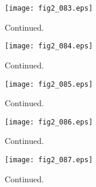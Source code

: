 \documentclass[preprint]{aastex}
\begin{document}
\setcounter{figure}{1}
\begin{figure}[t]
\centering
\texttt{[image: fig2\_083.eps]}
\caption{
Continued. 
}
\label{Fig2}
\end{figure}
\clearpage



\setcounter{figure}{1}
\begin{figure}[t]
\centering
\texttt{[image: fig2\_084.eps]}
\caption{
Continued. 
}
\label{Fig2}
\end{figure}
\clearpage



\setcounter{figure}{1}
\begin{figure}[t]
\centering
\texttt{[image: fig2\_085.eps]}
\caption{
Continued. 
}
\label{Fig2}
\end{figure}
\clearpage



\setcounter{figure}{1}
\begin{figure}[t]
\centering
\texttt{[image: fig2\_086.eps]}
\caption{
Continued. 
}
\label{Fig2}
\end{figure}
\clearpage



\setcounter{figure}{1}
\begin{figure}[t]
\centering
\texttt{[image: fig2\_087.eps]}
\caption{
Continued. 
}
\label{Fig2}
\end{figure}
\clearpage
\end{document}
